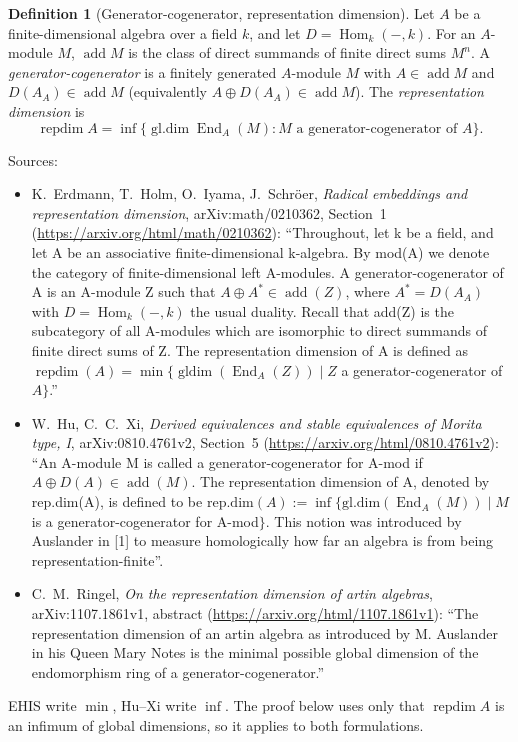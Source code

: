 \documentclass[11pt]{article}
\theoremstyle{definition}
\newtheorem{definition}[theorem]{Definition}
\theoremstyle{remark}
\renewcommand{\_}{\oldus\allowbreak}
\newcommand{\repdim}{\operatorname{repdim}}
\newcommand{\gldim}{\operatorname{gl.dim}}
\newcommand{\add}{\operatorname{add}}
\newcommand{\End}{\operatorname{End}}
\newcommand{\Hom}{\operatorname{Hom}}
\begin{document}
\begin{definition}[Generator-cogenerator, representation dimension]\label{def:repdim}
Let $A$ be a finite-dimensional algebra over a field $k$, and let $D = \Hom_k(-,k)$. For an $A$-module
$M$, $\add M$ is the class of direct summands of finite direct sums $M^n$. A
\emph{generator-cogenerator} is a finitely generated $A$-module $M$ with $A \in \add M$ and
$D(A_A) \in \add M$ (equivalently $A \oplus D(A_A) \in \add M$). The \emph{representation dimension} is
\[
  \repdim A = \inf\{\gldim \End_A(M) : M \text{ a generator-cogenerator of } A\}.
\]
\end{definition}

Sources:
\begin{itemize}
  \item K.~Erdmann, T.~Holm, O.~Iyama, J.~Schr\"oer, \emph{Radical embeddings and representation
        dimension}, arXiv:math/0210362, Section~1 (\url{https://arxiv.org/html/math/0210362}):
        ``Throughout, let k be a field, and let A be an associative finite-dimensional k-algebra. By
        mod(A) we denote the category of finite-dimensional left A-modules. A generator-cogenerator of A
        is an A-module Z such that $A \oplus A^* \in \add(Z)$, where $A^* = D(A_A)$ with
        $D = \Hom_k(-,k)$ the usual duality. Recall that add(Z) is the subcategory of all A-modules which
        are isomorphic to direct summands of finite direct sums of Z. The representation dimension of A
        is defined as $\repdim(A) = \min\{\operatorname{gldim}(\End_A(Z)) \mid Z$ a generator-cogenerator
        of $A\}$.''
  \item W.~Hu, C.~C.~Xi, \emph{Derived equivalences and stable equivalences of Morita type, I},
        arXiv:0810.4761v2, Section~5 (\url{https://arxiv.org/html/0810.4761v2}): ``An A-module M is
        called a generator-cogenerator for A-mod if $A \oplus D(A) \in \add(M)$. The representation
        dimension of A, denoted by rep.dim(A), is defined to be
        $\mathrm{rep.dim}(A) := \inf\{\mathrm{gl.dim}(\End_A(M)) \mid M$ is a generator-cogenerator for
        A-mod$\}$. This notion was introduced by Auslander in [1] to measure homologically how far an
        algebra is from being representation-finite''.
  \item C.~M.~Ringel, \emph{On the representation dimension of artin algebras}, arXiv:1107.1861v1,
        abstract (\url{https://arxiv.org/html/1107.1861v1}): ``The representation dimension of an artin
        algebra as introduced by M. Auslander in his Queen Mary Notes is the minimal possible global
        dimension of the endomorphism ring of a generator-cogenerator.''
\end{itemize}
EHIS write $\min$, Hu--Xi write $\inf$. The proof below uses only that $\repdim A$ is an infimum of
global dimensions, so it applies to both formulations.
\end{document}
